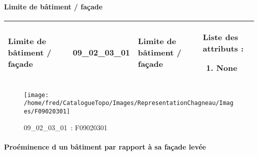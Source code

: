 \documentclass[12pt,titlepage,oneside]{book}
\begin{document}
\paragraph{Limite de bâtiment / façade}
\noindent
\vspace{\baselineskip}

\renewcommand{\arraystretch}{1.2}
\begin{supertabular}{|p{10cm}|c|p{13cm}|p{12cm}|}
 Limite de bâtiment / façade & 09\_02\_03\_01 & Limite de bâtiment / façade & Liste des attributs :
\begin{enumerate}
  \item None\end{enumerate}
\\
\hline
\end{supertabular}
\begin{figure}[h!]
  \hfill         %
  \begin{minipage}[t]{3cm}
    \begin{center}
      \texttt{[image: /home/fred/CatalogueTopo/Images/RepresentationChagneau/Images/F09020301]}
      \caption[~09\_02\_03\_01]{\small{09\_02\_03\_01~:} \tiny{F09020301}}\label{F09020301}
    \end{center}
  \end{minipage}
\end{figure}


\paragraph{Proéminence d un bâtiment par rapport à sa façade levée}
\noindent
\vspace{\baselineskip}
\end{document}
